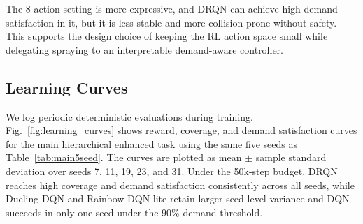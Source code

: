 \documentclass[conference,10pt]{IEEEtran}
\begin{document}
\begin{table}[t]
\centering
\caption{Ablation results over five seeds. Each row reports the best algorithm for that configuration. Ablation runs use 10k training steps and are intended for component-level diagnosis; they are not directly comparable to the 50k main run in Table~\ref{tab:main5seed}.}
\label{tab:ablation}
\end{table}

The 8-action setting is more expressive, and DRQN can achieve high demand satisfaction in it, but it is less stable and more collision-prone without safety. This supports the design choice of keeping the RL action space small while delegating spraying to an interpretable demand-aware controller.

\subsection{Learning Curves}
We log periodic deterministic evaluations during training. Fig.~\ref{fig:learning_curves} shows reward, coverage, and demand satisfaction curves for the main hierarchical enhanced task using the same five seeds as Table~\ref{tab:main5seed}. The curves are plotted as mean $\pm$ sample standard deviation over seeds 7, 11, 19, 23, and 31. Under the 50k-step budget, DRQN reaches high coverage and demand satisfaction consistently across all seeds, while Dueling DQN and Rainbow DQN lite retain larger seed-level variance and DQN succeeds in only one seed under the 90\% demand threshold.
\end{document}
